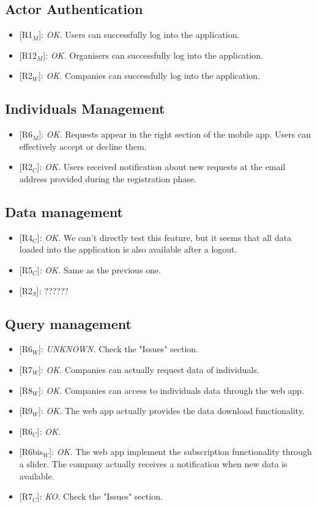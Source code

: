 \documentclass{article}
\begin{document}
\subsection{Actor Authentication} 
\begin{itemize}
	\item {[R1$_M$]}: \textit{OK.} Users can successfully log into the application.
	\item {[R12$_M$]}: \textit{OK.} Organisers can successfully log into the application.
	\item {[R2$_W$]}: \textit{OK.} Companies  can successfully log into the application.
\end{itemize}

\subsection{Individuals Management}
\begin{itemize}
	\item {[R6$_M$]}: \textit{OK.} Requests appear in the right section of the mobile app. Users can effectively accept or decline them.
	\item {[R2$_C$]}: \textit{OK.} Users received notification about new requests at the email address provided during the registration phase.
\end{itemize}

\subsection{Data management}
\begin{itemize}
	\item {[R4$_C$]}: \textit{OK.} We can't directly test this feature, but it seems that all data loaded into the application is also available after a logout.
	\item {[R5$_C$]}: \textit{OK.} Same as the previous one.
	\item {[R2$_S$]}: ??????
\end{itemize}

\subsection{Query management}

\begin{itemize}
	\item {[R6$_W$]}: \textit{UNKNOWN.} Check the "Issues" section.
	\item {[R7$_W$]}: \textit{OK.} Companies can actually request data of individuals. 
	\item {[R8$_W$]}: \textit{OK.} Companies can access to individuals data through the web app.
	\item {[R9$_W$]}: \textit{OK.} The web app actually provides the data download functionality.
	\item {[R6$_C$]}: \textit{OK.}
	\item {[R6bis$_W$]}: \textit{OK.} The web app implement the subscription functionality through a slider. The company actually receives a notification when new data is available.
	\item {[R7$_C$]}: \textit{KO.} Check the "Issues" section.
\end{itemize}
\end{document}
